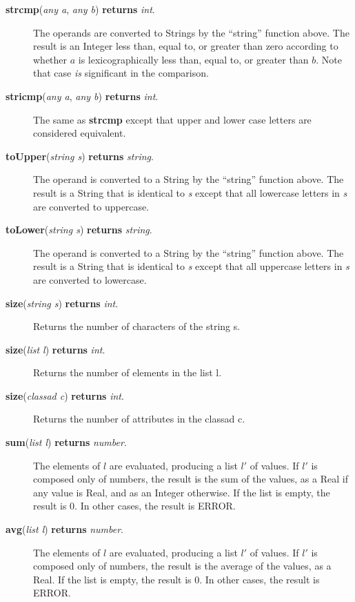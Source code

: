 \documentclass{article}
\begin{document}
\begin{description}
\item[\textbf{strcmp}(\emph{any a}, \emph{any b}) \textbf{returns} \emph{int}.]
The operands are converted to Strings by the ``string''
function above.  The result is an Integer less than, equal to, or greater than
zero according to whether $a$ is lexicographically less than,
equal to, or greater than $b$.
Note that case \emph{is} significant in the comparison.

\item[\textbf{stricmp}(\emph{any a}, \emph{any b}) \textbf{returns} \emph{int}.]

The same as \textbf{strcmp} except that upper and lower case letters are
considered equivalent.

\item[\textbf{toUpper}(\emph{string s}) \textbf{returns} \emph{string}.]

The operand is converted to a String by the ``string'' function above. The
result is a String that is identical to \emph{s} except that all lowercase
letters in \emph{s} are converted to uppercase.

\item[\textbf{toLower}(\emph{string s}) \textbf{returns} \emph{string}.]

The operand is converted to a String by the ``string'' function above. The
result is a String that is identical to \emph{s} except that all uppercase
letters in \emph{s} are converted to lowercase.

\item[\textbf{size}(\emph{string s}) \textbf{returns} \emph{int}.]
Returns the number of characters of the string s.

\item[\textbf{size}(\emph{list l}) \textbf{returns} \emph{int}.]
Returns the number of elements in the list l.

\item[\textbf{size}(\emph{classad c}) \textbf{returns} \emph{int}.]
Returns the number of attributes in the classad c.

\item[\textbf{sum}(\emph{list l}) \textbf{returns} \emph{number}.]
The elements of $l$ are evaluated, producing a list $l'$ of values.
If $l'$ is composed only of numbers, the result is the sum of the values,
as a Real if any value is Real, and as an Integer otherwise.
If the list is empty, the result is 0. In other cases, the result is ERROR.

\item[\textbf{avg}(\emph{list l}) \textbf{returns} \emph{number}.]  
The elements of $l$ are evaluated, producing a list $l'$ of values.
If $l'$ is composed only of numbers, the result is the average of the values,
as a Real.  If the list is empty, the result is 0. In other cases, the result
is ERROR.


\end{description}
\end{document}
